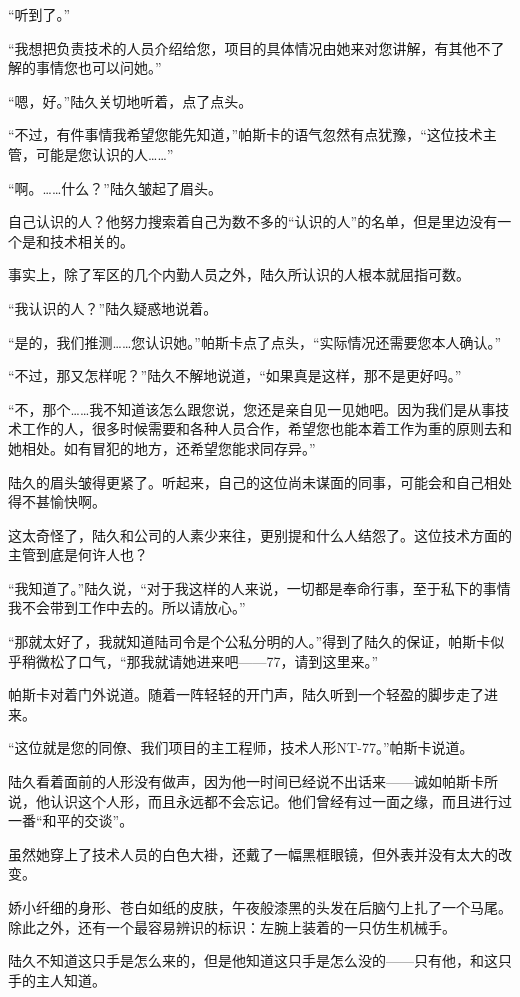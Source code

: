 “听到了。”

“我想把负责技术的人员介绍给您，项目的具体情况由她来对您讲解，有其他不了解的事情您也可以问她。”

“嗯，好。”陆久关切地听着，点了点头。

“不过，有件事情我希望您能先知道，”帕斯卡的语气忽然有点犹豫，“这位技术主管，可能是您认识的人……”

“啊。……什么？”陆久皱起了眉头。

自己认识的人？他努力搜索着自己为数不多的“认识的人”的名单，但是里边没有一个是和技术相关的。

事实上，除了军区的几个内勤人员之外，陆久所认识的人根本就屈指可数。

“我认识的人？”陆久疑惑地说着。

“是的，我们推测……您认识她。”帕斯卡点了点头，“实际情况还需要您本人确认。”

“不过，那又怎样呢？”陆久不解地说道，“如果真是这样，那不是更好吗。”

“不，那个……我不知道该怎么跟您说，您还是亲自见一见她吧。因为我们是从事技术工作的人，很多时候需要和各种人员合作，希望您也能本着工作为重的原则去和她相处。如有冒犯的地方，还希望您能求同存异。”

陆久的眉头皱得更紧了。听起来，自己的这位尚未谋面的同事，可能会和自己相处得不甚愉快啊。

这太奇怪了，陆久和公司的人素少来往，更别提和什么人结怨了。这位技术方面的主管到底是何许人也？

“我知道了。”陆久说，“对于我这样的人来说，一切都是奉命行事，至于私下的事情我不会带到工作中去的。所以请放心。”

“那就太好了，我就知道陆司令是个公私分明的人。”得到了陆久的保证，帕斯卡似乎稍微松了口气，“那我就请她进来吧——77，请到这里来。”

帕斯卡对着门外说道。随着一阵轻轻的开门声，陆久听到一个轻盈的脚步走了进来。

“这位就是您的同僚、我们项目的主工程师，技术人形NT-77。”帕斯卡说道。

陆久看着面前的人形没有做声，因为他一时间已经说不出话来——诚如帕斯卡所说，他认识这个人形，而且永远都不会忘记。他们曾经有过一面之缘，而且进行过一番“和平的交谈”。

虽然她穿上了技术人员的白色大褂，还戴了一幅黑框眼镜，但外表并没有太大的改变。

娇小纤细的身形、苍白如纸的皮肤，午夜般漆黑的头发在后脑勺上扎了一个马尾。除此之外，还有一个最容易辨识的标识：左腕上装着的一只仿生机械手。

陆久不知道这只手是怎么来的，但是他知道这只手是怎么没的——只有他，和这只手的主人知道。

